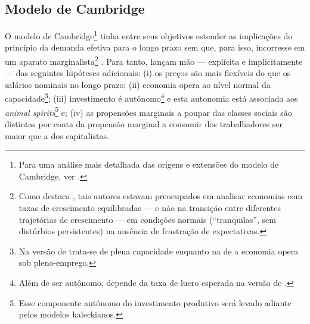 \subsection{Modelo de Cambridge}
\label{Sec_Cambridge}


O modelo de Cambridge\footnote{Para uma análise mais detalhada das origens e extensões do modelo de Cambridge, ver \textcite{baranzini_cambridge_2013}.} tinha entre seus objetivos estender as implicações do princípio da demanda efetiva para o longo prazo sem que, para isso, incorresse em um aparato marginalista\footnote{
	Como destaca \textcite[p.~127--133]{davidson_accumulation_1978}, tais autores estavam preocupados em analisar economias com taxas de crescimento equilibradas --- e não na transição entre diferentes trajetórias de crescimento --- em condições normais (``tranquilas'', sem distúrbios persistentes) na ausência de frustração de expectativas.
} \cites{kaldor_alternative_1955}{kaldor_model_1957}{robinson_model_1962}{pasinetti_rate_1962}. 
Para tanto, lançam mão --- explícita e implicitamente --- das seguintes hipóteses adicionais: 
	(i) os preços são mais flexíveis do que os salários nominais no longo prazo; 
	(ii) economia opera ao nível normal da capacidade\footnote{
		Na versão de \textcite{robinson_model_1962} trata-se de plena capacidade enquanto na de \textcite{kaldor_alternative_1955} a economia opera sob pleno-emprego.
	}; 
	(iii) investimento é autônomo\footnote{Além de ser autônomo, depende da taxa de lucro esperada na versão de \textcite{robinson_model_1962}.} e esta autonomia está associada aos  \textit{animal spirits}\footnote{Esse componente autônomo do investimento produtivo será levado adiante pelos modelos kaleckianos.} e;
	(iv) as propensões marginais a poupar das classes sociais são distintas por conta da propensão marginal a consumir dos trabalhadores ser maior que a dos capitalistas. 
	
